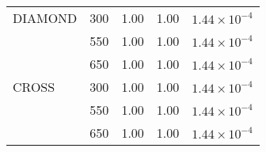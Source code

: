 \begin{table}[htbp]
\begin{tabular}{lllll}
    \midrule
    DIAMOND & 300   & 1.00  & 1.00  & $1.44\times 10^{-4}$ \\
          & 550   & 1.00  & 1.00  & $1.44\times 10^{-4}$ \\
          & 650   & 1.00  & 1.00  & $1.44\times 10^{-4}$ \\
    \midrule
    CROSS & 300   & 1.00  & 1.00  & $1.44\times 10^{-4}$ \\
          & 550   & 1.00  & 1.00  & $1.44\times 10^{-4}$ \\
          & 650   & 1.00  & 1.00  & $1.44\times 10^{-4}$ \\
    \bottomrule
    \end{tabular}%
  \label{tab:Loading-Conditions}%
\end{table}%

%
%
%

